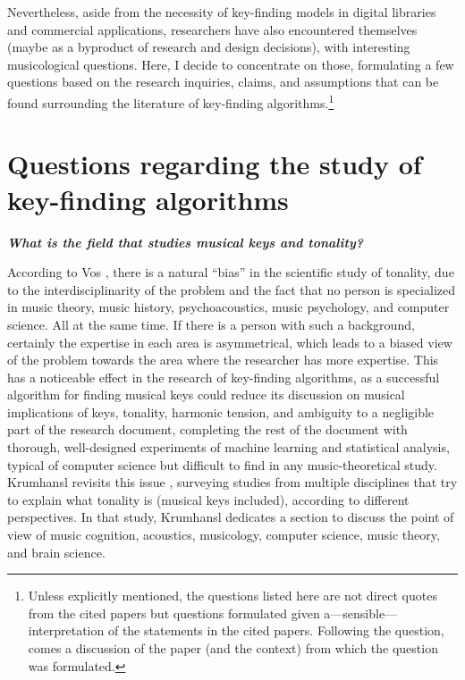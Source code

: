 Nevertheless, aside from the necessity of key-finding models in digital libraries and commercial applications, researchers have also encountered themselves (maybe as a byproduct of research and design decisions), with interesting musicological questions. Here, I decide to concentrate on those, formulating a few questions based on the research inquiries, claims, and assumptions that can be found surrounding the literature of key-finding algorithms.\footnote{Unless explicitly mentioned, the questions listed here are not direct quotes from the cited papers but questions formulated given a---sensible---interpretation of the statements in the cited papers. Following the question, comes a discussion of the paper (and the context) from which the question was formulated.}

\section{Questions regarding the study of key-finding algorithms}

\textbf{\emph{What is the field that studies musical keys and tonality?}}

According to Vos \cite{vos_tonality_2000}, there is a natural ``bias'' in the scientific study of tonality, due to the interdisciplinarity of the problem and the fact that no person is specialized in music theory, music history, psychoacoustics, music psychology, and computer science. All at the same time. If there is a person with such a background, certainly the expertise in each area is asymmetrical, which leads to a biased view of the problem towards the area where the researcher has more expertise. This has a noticeable effect in the research of key-finding algorithms, as a successful algorithm for finding musical keys \cite{korzeniowski_harmonic_2018}  could reduce its discussion on musical implications of keys, tonality, harmonic tension, and ambiguity to a negligible part of the research document, completing the rest of the document with thorough, well-designed experiments of machine learning and statistical analysis, typical of computer science but difficult to find in any music-theoretical study. Krumhansl revisits this issue \cite{krumhansl_cognition_2004}, surveying studies from multiple disciplines that try to explain what tonality is (musical keys included), according to different perspectives. In that study, Krumhansl dedicates a section to discuss the point of view of music cognition, acoustics, musicology, computer science, music theory, and brain science. 

